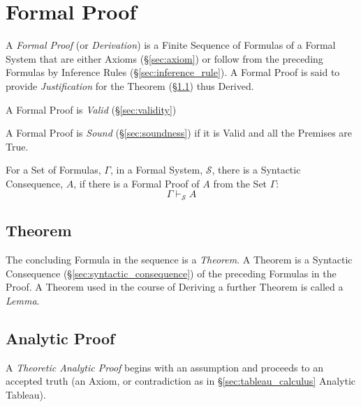 \section{Formal Proof} \label{sec:formal_proof}

A \emph{Formal Proof} (or \emph{Derivation}) is a Finite Sequence of
Formulas of a Formal System that are either Axioms (\S\ref{sec:axiom})
or follow from the preceding Formulas by Inference Rules
(\S\ref{sec:inference_rule}). A Formal Proof is said to provide
\emph{Justification} for the Theorem (\S\ref{sec:theorem}) thus
Derived.

A Formal Proof is \emph{Valid} (\S\ref{sec:validity})

A Formal Proof is \emph{Sound} (\S\ref{sec:soundness}) if it is Valid
and all the Premises are True.

For a Set of Formulas, $\Gamma$, in a Formal System, $\mathcal{S}$,
there is a Syntactic Consequence, $A$, if there is a Formal Proof of
$A$ from the Set $\Gamma$:
\[
    \Gamma \vdash_{\mathcal{S}} A
\]



\subsection{Theorem} \label{sec:theorem}

The concluding Formula in the sequence is a \emph{Theorem}. A Theorem
is a Syntactic Consequence (\S\ref{sec:syntactic_consequence}) of the
preceding Formulas in the Proof. A Theorem used in the course of Deriving
a further Theorem is called a \emph{Lemma}.



\subsection{Analytic Proof} \label{sec:analytic_proof}

A \emph{Theoretic Analytic Proof} begins with an assumption and
proceeds to an accepted truth (an Axiom, or contradiction as in
\S\ref{sec:tableau_calculus} Analytic Tableau).



